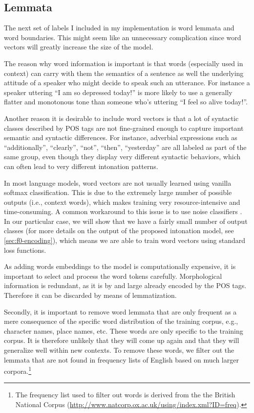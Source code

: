 \subsection{Lemmata}

The next set of labels I included in my implementation is word lemmata and word boundaries. 
This might seem like an unnecessary complication since word vectors will greatly increase the size of the model. 

The reason why word information is important is that words (especially used in context) can carry with them the semantics of a sentence as well the underlying attitude of a speaker who might decide to speak such an utterance.
For instance a speaker uttering ``I am so depressed today!'' is more likely to use a generally flatter and monotonous tone than someone who's uttering ``I feel so alive today!''.

Another reason it is desirable to include word vectors is that a lot of syntactic classes described by \ac{POS} tags are not fine-grained enough to capture important semantic and syntactic differences.
For instance, adverbial expressions such as ``additionally'', ``clearly'', ``not'', ``then'', ``yesterday'' are all labeled as part of the same group, even though they display very different syntactic behaviors, which can often lead to very different intonation patterns. 

In most language models, word vectors are not usually learned using vanilla softmax classification. 
This is due to the extremely large number of possible outputs (i.e., context words), which makes training very resource-intensive and time-consuming. 
A common workaround to this issue is to use noise classifiers \citep{Mikolov2013Distributed}. 
In our particular case, we will show that we have a fairly small number of output classes (for more details on the output of the proposed intonation model, see \autoref{sec:f0-encoding}), which means we are able to train word vectors using standard loss functions.

As adding words embeddings to the model is computationally expensive, it is important to select and process the word tokens carefully.
Morphological information is redundant, as it is by and large already encoded by the \ac{POS} tags.
Therefore it can be discarded by means of lemmatization.

Secondly, it is important to remove word lemmata that are only frequent as a mere consequence of the specific word distribution of the training corpus, e.g., character names, place names, etc.
These words are only specific to the training corpus.
It is therefore unlikely that they will come up again and that they will generalize well within new contexts.
To remove these words, we filter out the lemmata that are not found in frequency lists of English based on much larger corpora.\footnote{The frequency list used to filter out words is derived from the the British National Corpus (\url{http://www.natcorp.ox.ac.uk/using/index.xml?ID=freq}).}


